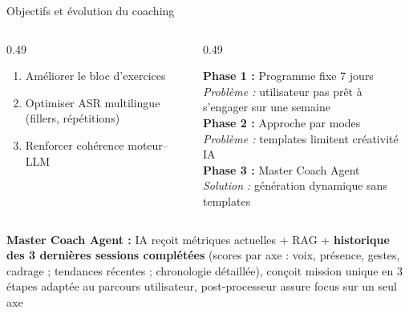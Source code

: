 \documentclass[10pt,aspectratio=169]{beamer}
\newcommand{\cmark}{\textcolor{success}{\ding{51}}}
\newcommand{\xmark}{\textcolor{danger}{\ding{55}}}
\begin{document}
\begin{frame}{Objectifs et évolution du coaching}
\begin{columns}[T]
\begin{column}{0.49\textwidth}
\begin{tcolorbox}[title=Objectifs de la phase, colframe=primary, colback=primary!3]
\small
\begin{enumerate}
    \item Améliorer le bloc d'exercices
    \item Optimiser ASR multilingue (fillers, répétitions)
    \item Renforcer cohérence moteur--LLM
\end{enumerate}
\end{tcolorbox}
\end{column}
\begin{column}{0.49\textwidth}
\begin{tcolorbox}[title=Évolution du coaching, colframe=accent, colback=accent!3]
\small
\textbf{Phase 1 :} Programme fixe 7 jours \xmark\\
\textit{Problème :} utilisateur pas prêt à s'engager sur une semaine\\
\textbf{Phase 2 :} Approche par modes \xmark\\
\textit{Problème :} templates limitent créativité IA\\
\textbf{Phase 3 :} Master Coach Agent \cmark\\
\textit{Solution :} génération dynamique sans templates
\end{tcolorbox}
\end{column}
\end{columns}
\vspace{0.3cm}
\begin{keybox}
\textbf{Master Coach Agent :} IA reçoit métriques actuelles + RAG + \textbf{historique des 3 dernières sessions complétées} (scores par axe : voix, présence, gestes, cadrage ; tendances récentes ; chronologie détaillée), conçoit mission unique en 3 étapes adaptée au parcours utilisateur, post-processeur assure focus sur un seul axe
\end{keybox}
\end{frame}
\end{document}
